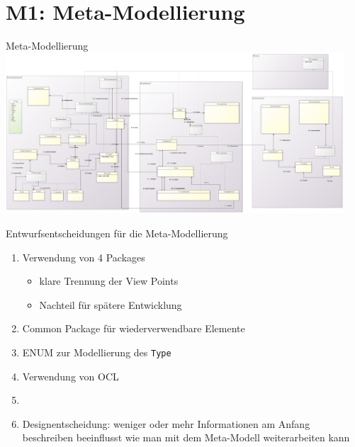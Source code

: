 \section[M1: Metamodell]{M1: Meta-Modellierung}
\begin{frame}{Meta-Modellierung}
	\centering
	\includegraphics[height=60mm]{figures/meta-modell.png}
\end{frame}

\begin{frame}{Entwurfsentscheidungen für die Meta-Modellierung}
	\begin{enumerate}
		\item Verwendung von 4 Packages
		\begin{itemize}
			\item klare Trennung der View Points
			\item Nachteil für spätere Entwicklung
		\end{itemize}
		\item Common Package für wiederverwendbare Elemente
		\item ENUM zur Modellierung des \texttt{Type}
		\item Verwendung von OCL
		\item \item Designentscheidung: weniger oder mehr Informationen am Anfang beschreiben beeinflusst wie man mit dem Meta-Modell weiterarbeiten kann
	\end{enumerate}
\end{frame}